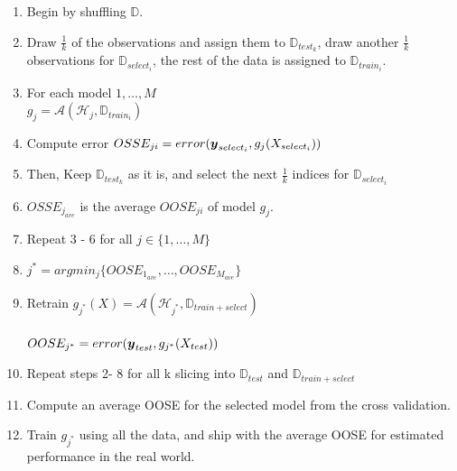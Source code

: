\documentclass[12pt]{article}
\begin{document}
\begin{enumerate}

\begin{enumerate}[1.]
\item Begin by shuffling $\mathbb{D}$.
\item Draw $\frac{1}{k}$ of the observations and assign them to $\mathbb{D}_{test_k}$, draw another $\frac{1}{k}$ observations for $\mathbb{D}_{select_i}$, the rest of the data is assigned to $\mathbb{D}_{train_i}$.  
\item For each model $1, \dots, M$ \\
$g_j = \mathcal{A} (\mathcal{H}_j, \mathbb{D}_{train_i})$
\item Compute error $OSSE_{ji} = error( \boldsymbol{y}_{select_i}, g_j (X_{select_i}))$
\item Then, Keep $\mathbb{D}_{test_k}$ as it is, and select the next $\frac{1}{k}$ indices for $\mathbb{D}_{select_i}$
\item $OSSE_{j_{ave}}$ is the average $OOSE_{ji}$ of model $g_j$.
\item Repeat 3 - 6 for all $j \in \{ 1, \dots, M\}$
\item $j^* =  argmin_j \{OOSE_{1_{ave}}, \dots, OOSE_{M_{ave}}\}$
\item Retrain $g_{j^*} (X) = \mathcal{A}  (\mathcal{H}_{j^*}, \mathbb{D}_{train + select})$ \\ \\
$OOSE_{j^*} = error( \boldsymbol{y}_{test}, g_{j^*} (X_{test}))$
\item Repeat steps 2- 8 for all k slicing into $\mathbb{D}_{test}$ and $\mathbb{D}_{train + select}$
\item Compute an average OOSE for the selected model from the cross validation. 
\item Train $g_{j^*}$ using all the data, and ship with the average OOSE for estimated performance in the real world. 
\end{enumerate}


\end{enumerate}


\end{document}
